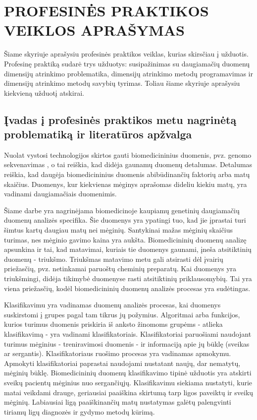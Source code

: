 
\section{PROFESINĖS PRAKTIKOS VEIKLOS APRAŠYMAS}
\label{praktikos_veiklos_aprasymas}

Šiame skyriuje aprašysiu profesinės praktikos veiklas, kurias skirsčiau į užduotis. Profesinę praktiką sudarė trys užduotys: susipažinimas su daugiamačių duomenų dimensijų atrinkimo problematika, dimensijų atrinkimo metodų programavimas ir dimensijų atrinkimo metodų savybių tyrimas. Toliau šiame skyriuje aprašysiu kiekvieną užduotį atskirai.

\subsection{Įvadas į profesinės praktikos metu nagrinėtą problematiką ir literatūros apžvalga}

Nuolat vystosi technologijos skirtos gauti biomedicininius duomenis, pvz. genomo sekvenavimas \cite{pettersson2009generations}, o tai reiškia, kad didėja gaunamų duomenų detalumas. Detalumas reiškia, kad daugėja biomedicininius duomenis abibūdinančių faktorių arba matų skaičius. Duomenys, kur kiekvienas mėginys aprašomas dideliu kiekiu matų, yra vadinami daugiamačiais duomenimis.

Šiame darbe yra nagrinėjama biomedicinoje kaupiamų genetinių daugiamačių duomenų analizės specifika. Šie duomenys yra ypatingi tuo, kad jie įprastai turi šimtus kartų daugiau matų nei mėginių. Santykinai mažas mėginių skaičius turimas, nes mėginio gavimo kaina yra aukšta. Biomedicininių duomenų analizę apsunkina ir tai, kad matavimai, kuriais tie duomenys gaunami, įneša atsitiktinių duomenų - triukšmo. Triukšmas matavimo metu gali atsirasti dėl įvairių priežasčių, pvz. netinkamai paruoštų cheminių preparatų. Kai duomenys yra triukšmingi, didėja tikimybė duomenyse rasti atsitiktinių priklausomybių. Tai yra viena priežasčių, kodėl biomedicininių duomenų analizės procesas yra sudėtingas.

Klasifikavimu \cite{fisher1936use} yra vadinamas duomenų analizės procesas, kai duomenys suskirstomi į grupes pagal tam tikrus jų požymius. Algoritmai arba funkcijos, kurios turimus duomenis priskiria iš anksto žinomoms grupėms - atlieka klasifikavimą - yra vadinami klasifikatoriais. Klasifikatoriai paruošiami naudojant turimus mėginius - treniravimosi duomenis - ir informaciją apie jų būklę (sveikas ar sergantis). Klasifikatoriaus ruošimo procesas yra vadinamas apmokymu. Apmokyti klasifikatoriai paprastai naudojami nustatant naujų, dar nematytų, mėginių būklę. Biomedicininių duomenų klasifikavimo tipinė užduotis yra atskirti sveikų pacientų mėginius nuo sergančiųjų. Klasifikavimu siekiama nustatyti, kurie matai veikdami drauge, geriausiai paaiškina skirtumą tarp ligos paveiktų ir sveikų mėginių. Labiausiai ligą paaiškinančių matų nustatymas galėtų palengvinti tiriamų ligų diagnozės ir gydymo metodų kūrimą.

